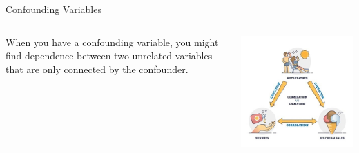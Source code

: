 \documentclass[
  ignorenonframetext,
]{beamer}
\begin{document}
\begin{frame}{Confounding Variables}
\label{confounding-variables}
\begin{columns}[T]
\begin{column}{0.48\textwidth}
When you have a confounding variable, you might find dependence between
two unrelated variables that are only connected by the confounder.
\end{column}

\begin{column}{0.48\textwidth}
\begin{center}
\includegraphics{class31_files/mediabag/confounders.jpg}
\end{center}
\end{column}
\end{columns}
\end{frame}
\end{document}
